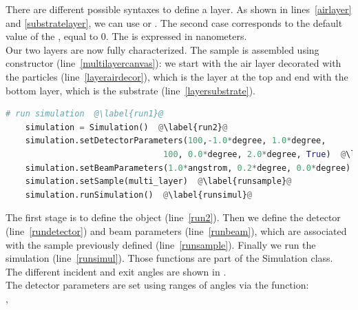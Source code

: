 \noindent There are different possible syntaxes to define a layer. As shown in
lines~\ref{airlayer} and \ref{substratelayer}, we can use
 or
. The second case corresponds
to the default value of the , equal to 0. The  is
expressed in  nanometers. \\

\noindent Our two layers are now fully characterized. The sample is assembled using
 constructor (line~\ref{multilayercanvas}): we start with the air layer decorated
with the particles (line~\ref{layerairdecor}), which is the layer at
the top and end with the bottom layer, which is the
substrate (line~\ref{layersubstrate}).


\begin{lstlisting}[language=python, style=eclipseboxed,name=ex1,nolol]
    # run simulation  @\label{run1}@
    simulation = Simulation()  @\label{run2}@
    simulation.setDetectorParameters(100,-1.0*degree, 1.0*degree, 
                                100, 0.0*degree, 2.0*degree, True)  @\label{rundetector}@
    simulation.setBeamParameters(1.0*angstrom, 0.2*degree, 0.0*degree)  @\label{runbeam}@
    simulation.setSample(multi_layer)  @\label{runsample}@
    simulation.runSimulation()  @\label{runsimul}@
\end{lstlisting}


\noindent The first stage is to define the  object (line~\ref{run2}). Then we define the detector (line~\ref{rundetector}) and beam
parameters (line~\ref{runbeam}), which are associated with the
sample previously defined (line~\ref{runsample}). Finally we run
the simulation (line~\ref{runsimul}). Those functions are part of the Simulation
class.  The
different incident and exit angles are
shown in . \\

\noindent The detector parameters are set using ranges of angles via
the function:\\

\noindent {}, \\

